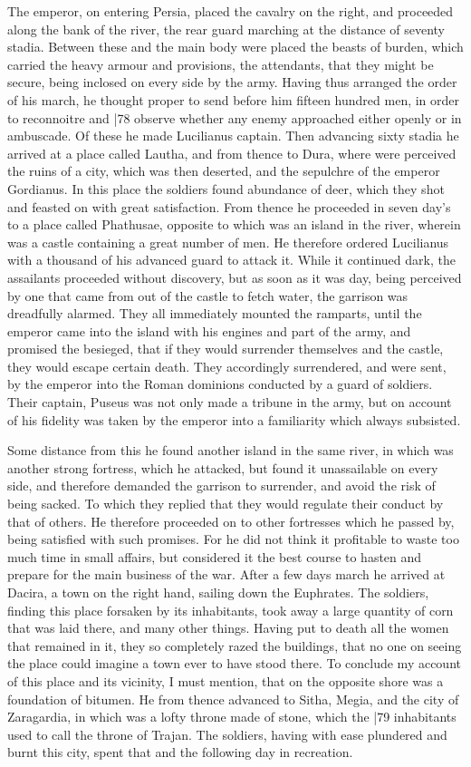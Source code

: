 The emperor, on entering Persia, placed the cavalry on the right, and proceeded along the bank of the river, the rear guard marching at the distance of seventy stadia. Between these and the main body were placed the beasts of burden, which carried the heavy armour and provisions, the attendants, that they might be secure, being inclosed on every side by the army. Having thus arranged the order of his march, he thought proper to send before him fifteen hundred men, in order to reconnoitre and
|78 observe whether any enemy approached either openly or in ambuscade. Of these he made Lucilianus captain. Then advancing sixty stadia he arrived at a place called Lautha, and from thence to Dura, where were perceived the ruins of a city, which was then deserted, and the sepulchre of the emperor Gordianus. In this place the soldiers found abundance of deer, which they shot and feasted on with great satisfaction. From thence he proceeded in seven day's to a place called Phathusae, opposite to which was an island in the river, wherein was a castle containing a great number of men. He therefore ordered Lucilianus with a thousand of his advanced guard to attack it. While it continued dark, the assailants proceeded without discovery, but as soon as it was day, being perceived by one that came from out of the castle to fetch water, the garrison was dreadfully alarmed. They all immediately mounted the ramparts, until the emperor came into the island with his engines and part of the army, and promised the besieged, that if they would surrender themselves and the castle, they would escape certain death. They accordingly surrendered, and were sent, by the emperor into the Roman dominions conducted by a guard of soldiers. Their captain, Puseus was not only made a tribune in the army, but on account of his fidelity was taken by the emperor into a familiarity which always subsisted.

Some distance from this he found another island in the same river, in which was another strong fortress, which he attacked, but found it unassailable on every side, and therefore demanded the garrison to surrender, and avoid the risk of being sacked. To which they replied that they would regulate their conduct by that of others. He therefore proceeded on to other fortresses which he passed by, being satisfied with such promises. For he did not think it profitable to waste too much time in small affairs, but considered it the best course to hasten and prepare for the main business of the war. After a few days march he arrived at Dacira, a town on the right hand, sailing down the Euphrates. The soldiers, finding this place forsaken by its inhabitants, took away a large quantity of corn that was laid there, and many other things. Having put to death all the women that remained in it, they so completely razed the buildings, that no one on seeing the place could imagine a town ever to have stood there. To conclude my account of this place and its vicinity, I must mention, that on the opposite shore was a foundation of bitumen. He from thence advanced to Sitha, Megia, and the city of Zaragardia, in which was a lofty throne made of stone, which the
|79 inhabitants used to call the throne of Trajan. The soldiers, having with ease plundered and burnt this city, spent that and the following day in recreation.

